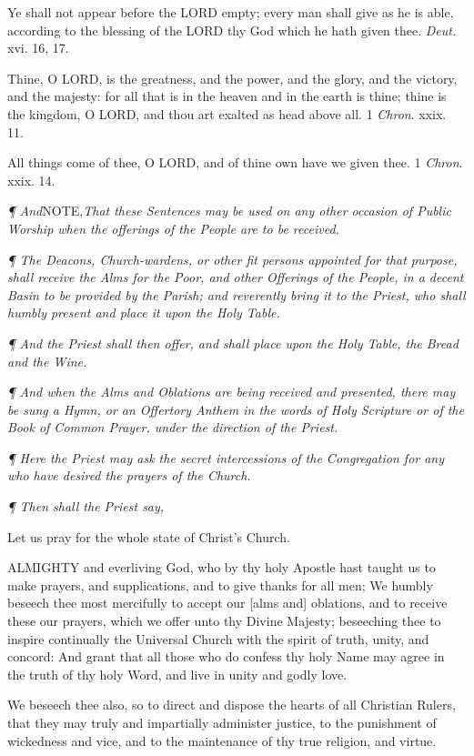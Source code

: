 Ye shall not appear before the LORD
empty; every man shall give as he is able, according to the blessing of
the LORD thy God which he hath given thee. \emph{Deut.}
xvi. 16, 17.

Thine, O LORD, is the greatness,
and the power, and the glory, and the victory, and the majesty: for all
that is in the heaven and in the earth is thine; thine is the kingdom,
O LORD, and thou art exalted as head above all.
1 \emph{Chron}. xxix. 11.

All things come of thee, O LORD,
and of thine own have we given thee. 1 \emph{Chron}. xxix. 14.

\emph{¶ And}NOTE,\emph{That these Sentences
may be used on any other occasion of Public Worship when the offerings
of the People are to be received.}

\emph{¶
The Deacons, Church-wardens, or other fit persons appointed for that purpose,
shall receive the Alms for the Poor, and other Offerings of the People,
in a decent Basin to be provided by the Parish; and reverently bring it
to the Priest, who shall humbly present and place it upon the Holy Table.}

\emph{¶
And the Priest shall then offer, and shall place upon the Holy Table,
the Bread and the Wine.}

\emph{¶
And when the Alms and Oblations are being received and presented, there
may be sung a Hymn, or an Offertory Anthem in the words of Holy Scripture
or of the Book of Common Prayer, under the direction of the Priest.}

\emph{¶
Here the Priest may ask the secret intercessions of the Congregation for
any who have desired the prayers of the Church.}

\emph{¶
Then shall the Priest say,}

Let us
pray for the whole state of Christ’s Church.

ALMIGHTY
and everliving God, who by thy holy Apostle hast taught us to make prayers,
and supplications, and to give thanks for all men; We humbly beseech thee
most mercifully to accept our [alms and] oblations, and to receive these
our prayers, which we offer unto thy Divine Majesty; beseeching thee to
inspire continually the Universal Church with the spirit of truth, unity,
and concord: And grant that all those who do confess thy holy Name may
agree in the truth of thy holy Word, and live in unity and godly love.

We beseech thee also, so to direct and dispose the
hearts of all Christian Rulers, that they may truly and impartially administer
justice, to the punishment of wickedness and vice, and to the maintenance
of thy true religion, and virtue.

